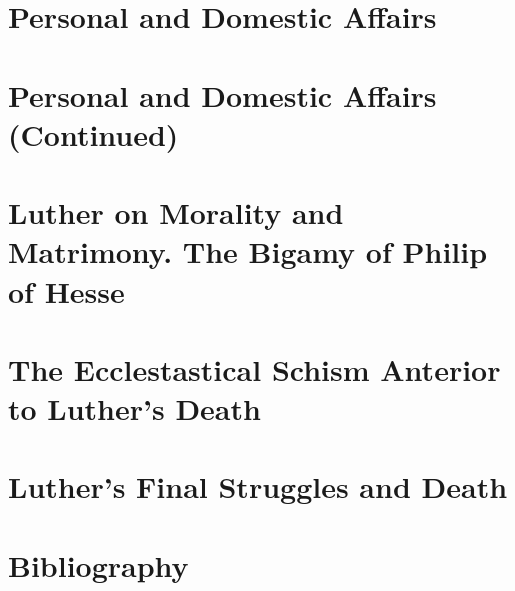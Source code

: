 \chapter{Personal and Domestic Affairs}



\chapter{Personal and Domestic Affairs (Continued)}



\chapter{Luther on Morality and Matrimony. The Bigamy of Philip of Hesse}




\chapter{The Ecclestastical Schism Anterior to Luther’s Death}



\chapter{Luther’s Final Struggles and Death}





\chapter{Bibliography}
\begin{hangparas}{1em}{1} %

\end{hangparas}

